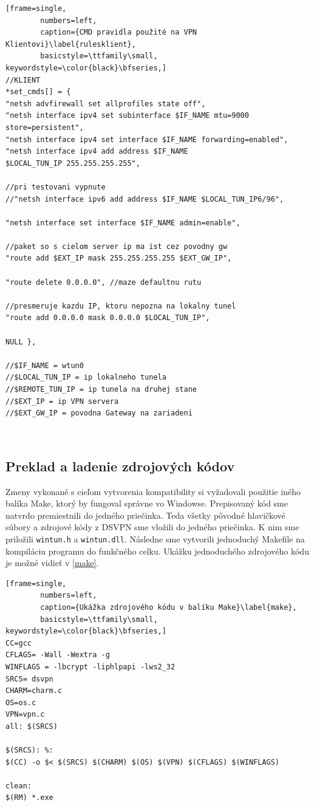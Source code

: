 \begin{minipage}{\linewidth} 	
	\begin{lstlisting}[frame=single,
		numbers=left,
		caption={CMD pravidla použité na VPN Klientovi}\label{rulesklient},
		basicstyle=\ttfamily\small, keywordstyle=\color{black}\bfseries,]
//KLIENT
*set_cmds[] = {
"netsh advfirewall set allprofiles state off",
"netsh interface ipv4 set subinterface $IF_NAME mtu=9000 
store=persistent",
"netsh interface ipv4 set interface $IF_NAME forwarding=enabled",
"netsh interface ipv4 add address $IF_NAME 
$LOCAL_TUN_IP 255.255.255.255",

//pri testovani vypnute			
//"netsh interface ipv6 add address $IF_NAME $LOCAL_TUN_IP6/96",

"netsh interface set interface $IF_NAME admin=enable",
			
//paket so s cielom server ip ma ist cez povodny gw 
"route add $EXT_IP mask 255.255.255.255 $EXT_GW_IP",
	
"route delete 0.0.0.0", //maze defaultnu rutu 
			
//presmeruje kazdu IP, ktoru nepozna na lokalny tunel                             
"route add 0.0.0.0 mask 0.0.0.0 $LOCAL_TUN_IP", 
			
NULL },    
		
//$IF_NAME = wtun0
//$LOCAL_TUN_IP = ip lokalneho tunela
//$REMOTE_TUN_IP = ip tunela na druhej stane
//$EXT_IP = ip VPN servera
//$EXT_GW_IP = povodna Gateway na zariadeni
	\end{lstlisting}
\end{minipage}\\ 

\subsection{Preklad a ladenie zdrojových kódov}
Zmeny vykonané s cieľom vytvorenia kompatibility si vyžadovali použitie iného balíka Make, ktorý by fungoval správne vo Windowse. Prepisovaný kód sme natvrdo premiestnili do jedného priečinka. Teda všetky pôvodné hlavičkové súbory a zdrojové kódy z DSVPN sme vložili do jedného priečinka. K nim sme priložili \lstinline|wintun.h| a \lstinline|wintun.dll|. Následne sme vytvorili jednoduchý Makefile na kompiláciu programu do funkčného celku. Ukážku jednoduchého zdrojového kódu je možné vidieť v \ref{make}. 

\begin{minipage}{\linewidth} 	
	\begin{lstlisting}[frame=single,
		numbers=left,
		caption={Ukážka zdrojového kódu v balíku Make}\label{make},
		basicstyle=\ttfamily\small, keywordstyle=\color{black}\bfseries,]
CC=gcc
CFLAGS= -Wall -Wextra -g 
WINFLAGS = -lbcrypt -liphlpapi -lws2_32
SRCS= dsvpn
CHARM=charm.c
OS=os.c
VPN=vpn.c
all: $(SRCS) 

$(SRCS): %:
$(CC) -o $< $(SRCS) $(CHARM) $(OS) $(VPN) $(CFLAGS) $(WINFLAGS)

clean:
$(RM) *.exe 
	\end{lstlisting}
\end{minipage}\\

